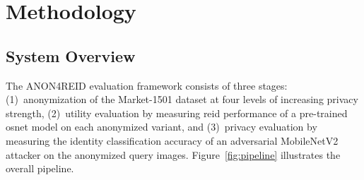 \chapter{Methodology}

\section{System Overview}

The ANON4REID evaluation framework consists of three stages: (1)~anonymization of the Market-1501 dataset at four levels of increasing privacy strength, (2)~utility evaluation by measuring \acrshort{reid} performance of a pre-trained \acrshort{osnet} model on each anonymized variant, and (3)~privacy evaluation by measuring the identity classification accuracy of an adversarial MobileNetV2 attacker on the anonymized query images. Figure~\ref{fig:pipeline} illustrates the overall pipeline.

